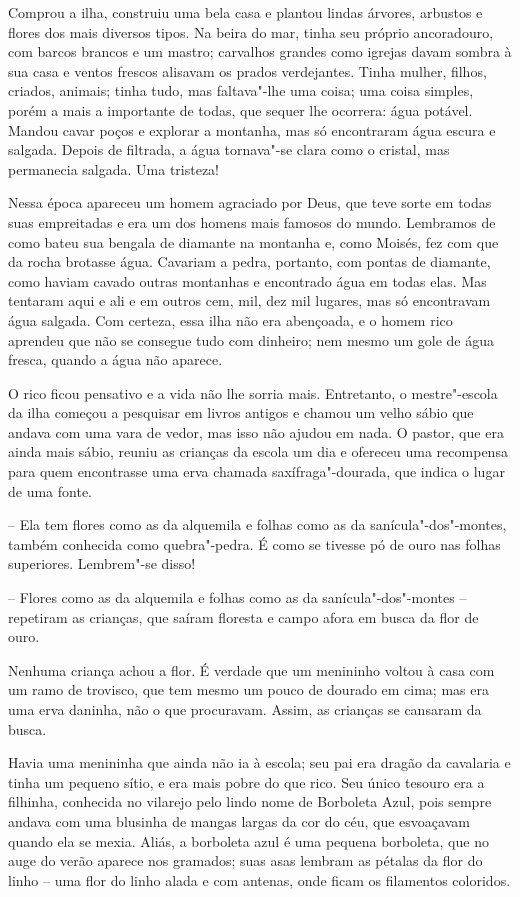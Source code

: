 Comprou a ilha, construiu uma bela casa e plantou lindas árvores,
arbustos e flores dos mais diversos tipos. Na beira do mar, tinha seu
próprio ancoradouro, com barcos brancos e um mastro; carvalhos grandes
como igrejas davam sombra à sua casa e ventos frescos alisavam os
prados verdejantes. Tinha mulher, filhos, criados, animais; tinha tudo,
mas faltava"-lhe uma coisa; uma coisa simples, porém a mais a
importante de todas, que sequer lhe ocorrera: água potável. Mandou
cavar poços e explorar a montanha, mas só encontraram água escura e
salgada. Depois de filtrada, a água tornava"-se clara como o cristal,
mas permanecia salgada. Uma tristeza!

Nessa época apareceu um homem agraciado por Deus, que teve sorte em
todas suas empreitadas e era um dos homens mais famosos do mundo.
Lembramos de como bateu sua bengala de diamante na montanha e, como
Moisés, fez com que da rocha brotasse água. Cavariam a pedra, portanto,
com pontas de diamante, como haviam cavado outras montanhas e
encontrado água em todas elas. Mas tentaram aqui e ali e em outros cem,
mil, dez mil lugares, mas só encontravam água salgada. Com certeza,
essa ilha não era abençoada, e o homem rico aprendeu que não se
consegue tudo com dinheiro; nem mesmo um gole de água
fresca, quando a água não aparece.

O rico ficou pensativo e a vida não lhe sorria mais. Entretanto, o
mestre"-escola da ilha começou a pesquisar em livros antigos e chamou
um velho sábio que andava com uma vara de vedor, mas isso não ajudou em
nada. O pastor, que era ainda mais sábio, reuniu as crianças da escola
um dia e ofereceu uma recompensa para quem encontrasse uma erva chamada
saxífraga"-dourada, que indica o lugar de uma fonte. 

-- Ela tem flores como as da alquemila e folhas como as da
sanícula"-dos"-montes, também conhecida como quebra"-pedra. É como
se tivesse pó de ouro nas folhas superiores. Lembrem"-se disso!

-- Flores como as da alquemila e folhas como as da
sanícula"-dos"-montes -- repetiram as crianças, que saíram floresta e
campo afora em busca da flor de ouro.

Nenhuma criança achou a flor. É verdade que um menininho voltou à casa
com um ramo de trovisco, que tem mesmo um pouco de dourado em cima; mas
era uma erva daninha, não o que procuravam. Assim, as crianças se
cansaram da busca.

Havia uma menininha que ainda não ia à escola; seu pai era dragão da
cavalaria e tinha um pequeno sítio, e era mais pobre do que rico. Seu
único tesouro era a filhinha, conhecida no vilarejo pelo lindo nome de
Borboleta Azul, pois sempre andava com uma blusinha de mangas largas da
cor do céu, que esvoaçavam quando ela se mexia. Aliás, a borboleta azul
é uma pequena borboleta, que no auge do verão aparece nos gramados;
suas asas lembram as pétalas da flor do linho -- uma flor do linho alada
e com antenas, onde ficam os filamentos coloridos.

